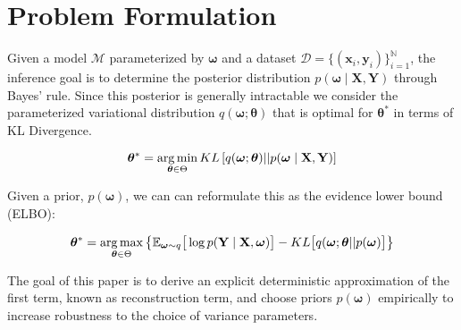 \section{Problem Formulation}
\label{sec:problem_formulation}

Given a model $\mathcal{M}$ parameterized by $\bm{\omega}$ and a dataset $\mathcal{D} = \{(\mathbf{x}_i,\mathbf{y}_i)\}_{i=1}^{\mathbb{N}}$, the inference goal is to determine the posterior distribution $p(\bm{\omega} \mid \mathbf{X}, \mathbf{Y})$ through Bayes' rule. Since this posterior is generally intractable we consider the parameterized variational distribution $q(\bm{\omega};\bm{\theta})$ that is optimal for $\bm{\theta}^*$ in terms of KL Divergence.

$$
\bm{\theta}^* = \mathop{\arg\min}\limits_{\bm{\theta}\in\Theta} KL\left[q(\bm{\omega};\bm{\theta})||p(\bm{\omega} \mid \mathbf{X}, \mathbf{Y})\right]
$$

Given a prior, $p(\bm{\omega})$, we can can reformulate this as the evidence lower bound (ELBO):

\begin{equation}
\bm{\theta}^* = \mathop{\arg\max}\limits_{\bm{\theta}\in\Theta}\left\{\mathbb{E}_{\bm{\omega}\sim q}\big[\log p(\mathbf{Y} \mid \mathbf{X}, \bm{\omega})\big] - KL\big[q(\bm{\omega};\bm{\theta} || p(\bm{\omega})\big]\right\}
\end{equation}

The goal of this paper is to derive an explicit deterministic approximation of the first term, known as reconstruction term, and choose priors $p(\bm{\omega})$ empirically to increase robustness to the choice of variance parameters.


